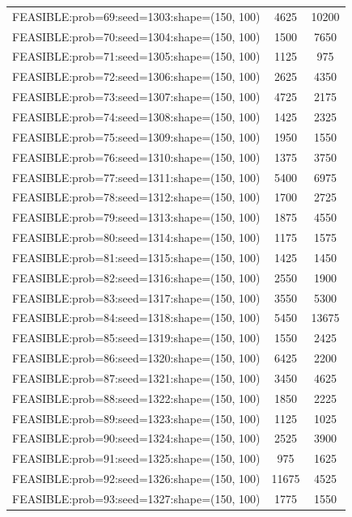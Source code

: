 \begin{longtable}{lcc}
FEASIBLE:prob=69:seed=1303:shape=(150, 100)  &     4625 & 10200 \\
FEASIBLE:prob=70:seed=1304:shape=(150, 100)  &     1500 &  7650 \\
FEASIBLE:prob=71:seed=1305:shape=(150, 100)  &     1125 &   975 \\
FEASIBLE:prob=72:seed=1306:shape=(150, 100)  &     2625 &  4350 \\
FEASIBLE:prob=73:seed=1307:shape=(150, 100)  &     4725 &  2175 \\
FEASIBLE:prob=74:seed=1308:shape=(150, 100)  &     1425 &  2325 \\
FEASIBLE:prob=75:seed=1309:shape=(150, 100)  &     1950 &  1550 \\
FEASIBLE:prob=76:seed=1310:shape=(150, 100)  &     1375 &  3750 \\
FEASIBLE:prob=77:seed=1311:shape=(150, 100)  &     5400 &  6975 \\
FEASIBLE:prob=78:seed=1312:shape=(150, 100)  &     1700 &  2725 \\
FEASIBLE:prob=79:seed=1313:shape=(150, 100)  &     1875 &  4550 \\
FEASIBLE:prob=80:seed=1314:shape=(150, 100)  &     1175 &  1575 \\
FEASIBLE:prob=81:seed=1315:shape=(150, 100)  &     1425 &  1450 \\
FEASIBLE:prob=82:seed=1316:shape=(150, 100)  &     2550 &  1900 \\
FEASIBLE:prob=83:seed=1317:shape=(150, 100)  &     3550 &  5300 \\
FEASIBLE:prob=84:seed=1318:shape=(150, 100)  &     5450 & 13675 \\
FEASIBLE:prob=85:seed=1319:shape=(150, 100)  &     1550 &  2425 \\
FEASIBLE:prob=86:seed=1320:shape=(150, 100)  &     6425 &  2200 \\
FEASIBLE:prob=87:seed=1321:shape=(150, 100)  &     3450 &  4625 \\
FEASIBLE:prob=88:seed=1322:shape=(150, 100)  &     1850 &  2225 \\
FEASIBLE:prob=89:seed=1323:shape=(150, 100)  &     1125 &  1025 \\
FEASIBLE:prob=90:seed=1324:shape=(150, 100)  &     2525 &  3900 \\
FEASIBLE:prob=91:seed=1325:shape=(150, 100)  &      975 &  1625 \\
FEASIBLE:prob=92:seed=1326:shape=(150, 100)  &    11675 &  4525 \\
FEASIBLE:prob=93:seed=1327:shape=(150, 100)  &     1775 &  1550 \\

\end{longtable}
